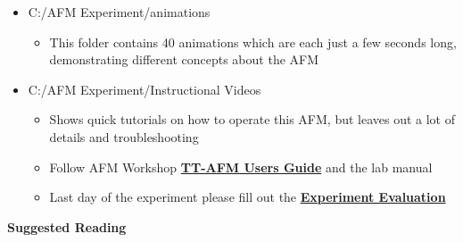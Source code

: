 \documentclass{../lab}
\begin{document}
\begin{itemize}
    \item C:/AFM Experiment/animations

    \begin{itemize}
        \item This folder contains 40 animations which are each just a few seconds long, demonstrating different concepts about the AFM

    \end{itemize}

    \item C:/AFM Experiment/Instructional Videos

    \begin{itemize}
        \item Shows quick tutorials on how to operate this AFM, but leaves out a lot of details and troubleshooting

        \item Follow AFM Workshop \href{http://experimentationlab.berkeley.edu/sites/default/files/AFMImages/TT_AFM\%20User-Guide-V2.2-600DPI.pdf}{\textbf{TT-AFM Users Guide}} and the  lab manual

        \item Last day of the experiment please fill out the \href{\ExperimentEvaluation}{\textbf{Experiment Evaluation}}

    \end{itemize}

\end{itemize}

\textbf{Suggested Reading}
\end{document}
